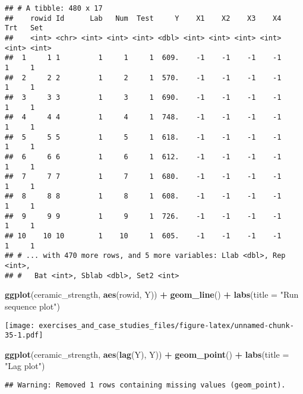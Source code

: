 \documentclass[]{book}
\newenvironment{Shaded}{\begin{snugshade}}{\end{snugshade}}
\newcommand{\DataTypeTok}[1]{\textcolor[rgb]{0.13,0.29,0.53}{#1}}
\newcommand{\KeywordTok}[1]{\textcolor[rgb]{0.13,0.29,0.53}{\textbf{#1}}}
\newcommand{\NormalTok}[1]{#1}
\newcommand{\OperatorTok}[1]{\textcolor[rgb]{0.81,0.36,0.00}{\textbf{#1}}}
\newcommand{\StringTok}[1]{\textcolor[rgb]{0.31,0.60,0.02}{#1}}
\theoremstyle{definition}
\theoremstyle{definition}
\theoremstyle{definition}
\theoremstyle{remark}
\begin{document}
\begin{verbatim}
## # A tibble: 480 x 17
##    rowid Id      Lab   Num  Test     Y    X1    X2    X3    X4   Trt   Set
##    <int> <chr> <int> <int> <int> <dbl> <int> <int> <int> <int> <int> <int>
##  1     1 1         1     1     1  609.    -1    -1    -1    -1     1     1
##  2     2 2         1     2     1  570.    -1    -1    -1    -1     1     1
##  3     3 3         1     3     1  690.    -1    -1    -1    -1     1     1
##  4     4 4         1     4     1  748.    -1    -1    -1    -1     1     1
##  5     5 5         1     5     1  618.    -1    -1    -1    -1     1     1
##  6     6 6         1     6     1  612.    -1    -1    -1    -1     1     1
##  7     7 7         1     7     1  680.    -1    -1    -1    -1     1     1
##  8     8 8         1     8     1  608.    -1    -1    -1    -1     1     1
##  9     9 9         1     9     1  726.    -1    -1    -1    -1     1     1
## 10    10 10        1    10     1  605.    -1    -1    -1    -1     1     1
## # ... with 470 more rows, and 5 more variables: Llab <dbl>, Rep <int>,
## #   Bat <int>, Sblab <dbl>, Set2 <int>
\end{verbatim}

\begin{Shaded}
\begin{Highlighting}[]
\KeywordTok{ggplot}\NormalTok{(ceramic_strength, }\KeywordTok{aes}\NormalTok{(rowid, Y)) }\OperatorTok{+}
\StringTok{  }\KeywordTok{geom_line}\NormalTok{() }\OperatorTok{+}
\StringTok{  }\KeywordTok{labs}\NormalTok{(}\DataTypeTok{title =} \StringTok{"Run sequence plot"}\NormalTok{)}
\end{Highlighting}
\end{Shaded}

\texttt{[image: exercises\_and\_case\_studies\_files/figure-latex/unnamed-chunk-35-1.pdf]}

\begin{Shaded}
\begin{Highlighting}[]
\KeywordTok{ggplot}\NormalTok{(ceramic_strength, }\KeywordTok{aes}\NormalTok{(}\KeywordTok{lag}\NormalTok{(Y), Y)) }\OperatorTok{+}
\StringTok{  }\KeywordTok{geom_point}\NormalTok{() }\OperatorTok{+}
\StringTok{  }\KeywordTok{labs}\NormalTok{(}\DataTypeTok{title =} \StringTok{"Lag plot"}\NormalTok{)}
\end{Highlighting}
\end{Shaded}

\begin{verbatim}
## Warning: Removed 1 rows containing missing values (geom_point).
\end{verbatim}
\end{document}
